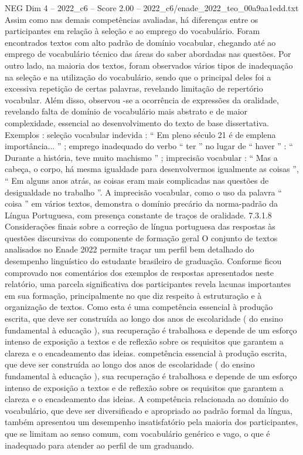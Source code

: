 \begin{textsample}{NEG Dim 4 – 2022\_c6 – Score 2.00 – 2022\_c6/enade\_2022\_teo\_00a9aa1edd.txt}
Assim como nas demais competências avaliadas, há diferenças entre os participantes em relação à seleção e ao emprego do vocabulário.
Foram encontrados textos com alto padrão de domínio vocabular, chegando até ao emprego de vocabulário técnico das áreas do saber abordadas nas questões.
Por outro lado, na maioria dos textos, foram observados vários tipos de inadequação na seleção e na utilização do vocabulário, sendo que o principal deles foi a excessiva repetição de certas palavras, revelando limitação de repertório vocabular.
Além disso, observou -se a ocorrência de expressões da oralidade, revelando falta de domínio de vocabulário mais abstrato e de maior complexidade, essencial ao desenvolvimento do texto de base dissertativa.
Exemplos : seleção vocabular indevida : “ Em pleno século 21 é de emplena importância... ” ; emprego inadequado do verbo “ ter ” no lugar de “ haver ” : “ Durante a história, teve muito machismo ” ; imprecisão vocabular : “ Mas a cabeça, o corpo, há mesma igualdade para desenvolvermos igualmente as coisas ”, “ Em alguns anos atrás, as coisas eram mais complicadas nas questões de desigualdade no trabalho ”.
A imprecisão vocabular, como o uso da palavra “ coisa ” em vários textos, demonstra o domínio precário da norma-padrão da Língua Portuguesa, com presença constante de traços de oralidade. 7.3.1.8 Considerações finais sobre a correção de língua portuguesa das respostas às questões discursivas do componente de formação geral O conjunto de textos analisados no Enade 2022 permite traçar um perfil bem detalhado do desempenho linguístico do estudante brasileiro de graduação.
Conforme ficou comprovado nos comentários dos exemplos de respostas apresentados neste relatório, uma parcela significativa dos participantes revela lacunas importantes em sua formação, principalmente no que diz respeito à estruturação e à organização de textos.
Como esta é uma competência essencial à produção escrita, que deve ser construída ao longo dos anos de escolaridade ( do ensino fundamental à educação ), sua recuperação é trabalhosa e depende de um esforço intenso de exposição a textos e de reflexão sobre os requisitos que garantem a clareza e o encadeamento das ideias. competência essencial à produção escrita, que deve ser construída ao longo dos anos de escolaridade ( do ensino fundamental à educação ), sua recuperação é trabalhosa e depende de um esforço intenso de exposição a textos e de reflexão sobre os requisitos que garantem a clareza e o encadeamento das ideias.
A competência relacionada ao domínio do vocabulário, que deve ser diversificado e apropriado ao padrão formal da língua, também apresentou um desempenho insatisfatório pela maioria dos participantes, que se limitam ao senso comum, com vocabulário genérico e vago, o que é inadequado para atender ao perfil de um graduando.

\end{textsample}
